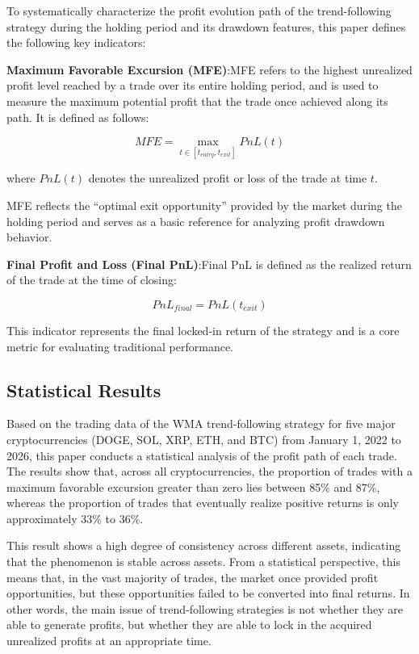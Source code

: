 \documentclass[12pt]{article}
\begin{document}
To systematically characterize the profit evolution path of the trend-following strategy during the holding period and its drawdown features, this paper defines the following key indicators:

\textbf{Maximum Favorable Excursion (MFE)}:MFE refers to the highest unrealized profit level 
reached by a trade over its entire holding period, and is used to measure the maximum potential 
profit that the trade once achieved along its path. It is defined as follows:

\begin{equation}
    MFE = \max_{t \in [t_{entry}, t_{exit}]} PnL(t)
\end{equation}

where $PnL(t)$ denotes the unrealized profit or loss of the trade at time $t$.

MFE reflects the ``optimal exit opportunity'' provided by the market during the holding period and serves as a basic reference for analyzing profit drawdown behavior.

\textbf{Final Profit and Loss (Final PnL)}:Final PnL is defined as the realized return of the 
trade at the time of closing:

\begin{equation}
    PnL_{final} = PnL(t_{exit})
\end{equation}

This indicator represents the final locked-in return of the strategy and is a core metric for 
evaluating traditional performance.

\subsection{Statistical Results}

Based on the trading data of the WMA trend-following strategy for five major cryptocurrencies 
(DOGE, SOL, XRP, ETH, and BTC) from January 1, 2022 to 2026, this paper conducts a statistical 
analysis of the profit path of each trade. The results show that, across all cryptocurrencies, 
the proportion of trades with a maximum favorable excursion greater than zero lies between 85\% 
and 87\%, whereas the proportion of trades that eventually realize positive returns is only 
approximately 33\% to 36\%.

This result shows a high degree of consistency across different assets, indicating that the 
phenomenon is stable across assets. From a statistical perspective, this means that, in the 
vast majority of trades, the market once provided profit opportunities, but these opportunities 
failed to be converted into final returns. In other words, the main issue of trend-following 
strategies is not whether they are able to generate profits, but whether they are able to lock 
in the acquired unrealized profits at an appropriate time.
\end{document}
